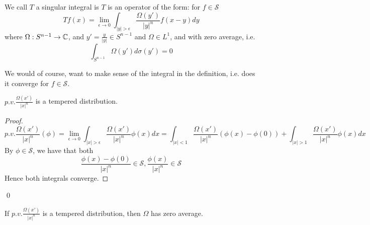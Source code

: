 \begin{definition}
    We call $T$ a singular integral is $T$ is an operator of the form: for $f\in\mathcal{S}$
    \begin{equation*}
        Tf(x)=\lim_{\epsilon\to 0}\int_{|y|>\epsilon}\frac{\Omega(y')}{|y|^n}f(x-y)dy
    \end{equation*}
    where $\Omega:S^{n-1}\to\mathbb{C}$, and $y'=\frac{y}{|y|}\in S^{n-1}$ and $\Omega\in L^1$, and with zero average, i.e.
    \begin{equation*}
            \int_{S^{n-1}}\Omega(y')d\sigma(y')=0
    \end{equation*}
\end{definition}
We would of course, want to make sense of the integral in the definition, i.e. does it converge for $f\in\mathcal{S}$.
\begin{proposition}
    $p.v. \frac{\Omega(x')}{|x|^n}$ is a tempered distribution.
\end{proposition}
\begin{proof}
    \begin{equation*}
        p.v.\frac{\Omega(x')}{|x|^n}(\phi)=\lim_{\epsilon\to 0}\int_{|x|>\epsilon}\frac{\Omega(x')}{|x|^n}\phi(x)dx=\int_{|x|<1}\frac{\Omega(x')}{|x|^n}(\phi(x)-\phi(0))+\int_{|x|>1}\frac{\Omega(x')}{|x|^n}\phi(x)dx
    \end{equation*}
    By $\phi\in\mathcal{S}$, we have that both 
    \begin{equation*}
        \frac{\phi(x)-\phi(0)}{|x|^n}\in\mathcal{S}, \frac{\phi(x)}{|x|^n}\in\mathcal{S}
    \end{equation*}
    Hence both integrals converge.
\end{proof}
\qed

\begin{corollary}
    If $p.v.\frac{\Omega(x')}{|x|^n}$ is a tempered distribution, then $\Omega$ has zero average.
\end{corollary}

